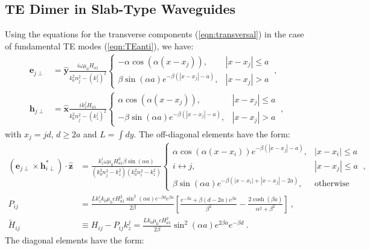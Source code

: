 \subsection{TE Dimer in Slab-Type Waveguides}
Using the equations for the transverse components (\ref{eqn:transversal}) in the case of fundamental TE modes (\ref{eqn:TEanti}), we have:
\begin{align*}
	\textbf{e}_{j\perp} &= \hat{\textbf{y}}\frac{i\omega\mu_0 H_{a1}}{k_0^2n_j^2 - (k_z^j)^2}\left\{ \begin{matrix}
-\alpha \cos(\alpha (x-x_j)), &|x-x_j|\le a
\\
\beta\sin(\alpha a) e^{-\beta(|x-x_j|-a)}, &|x-x_j| > a
\end{matrix}\right. \ ,
\\
\textbf{h}_{j\perp} &= \hat{\textbf{x}}\frac{ik_z^j H_{a1}}{k_0^2n_j^2 - (k_z^j)^2}\left\{ \begin{matrix}
\alpha \cos(\alpha (x-x_j)), &|x-x_j|\le a
\\
-\beta\sin(\alpha a) e^{-\beta(|x-x_j|-a)}, &|x-x_j| > a
\end{matrix}\right. \ ,
\end{align*} with $x_j=jd$, $d\ge 2a$ and $L=\int dy$. The off-diagonal elements have the form:
\begin{align*}
	\left(\textbf{e}_{j\perp}\times\textbf{h}_{i\perp}^*\right)\cdot \hat{\textbf{z}}
	&=
	\frac{k_z^i \omega \mu_0 H_{a1}^2 \beta\sin(\alpha a)}{(k_0^2n_j^2 - k_z^2)(k_0^2n_i^2 - k_z^2)}
	\left\{
	\begin{matrix}
		 \alpha\cos(\alpha(x-x_i))e^{-\beta(|x-x_j|-a)}, & |x-x_i| \le a
		\\
		i \leftrightarrow j, & |x-x_j| \le a
		\\
		\beta \sin(\alpha a)e^{-\beta (|x-x_i|+|x-x_j|-2a)}, & \text{otherwise}
	\end{matrix}
	\right. \ ,
\\
	P_{ij} &= \frac{L k_z^i k_0  \mu_0 c H_{a1}^2 \sin^2(\alpha a)e^{-\beta d}e^{\beta a}}{2\beta} \left[\frac{e^{-\beta a} + \beta (d-2a)e^{\beta a}}{\beta^2} - \frac{2\cosh(\beta a)}{\alpha^2+\beta^2} \right] \ ,
\\
	\tilde{H}_{ij} &\equiv H_{ij} - P_{ij} k_z^j = \frac{L k_0    \mu_0 c H_{a1}^2 }{2 \beta }  \sin^2(\alpha a)e^{2\beta a} e^{-\beta d} \ .
\end{align*}
The diagonal elements have the form:
